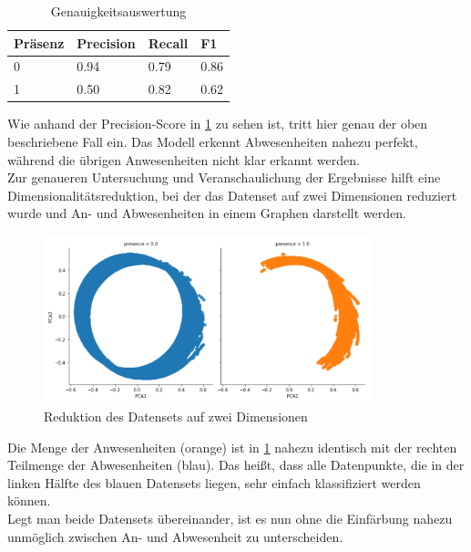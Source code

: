 \begin{center}
    \begin{table}[h]
        \centering
        \caption{Genauigkeitsauswertung}
        \begin{tabular}{|p{1.5cm}||p{1.8cm}|p{1.5cm}|p{1.5cm}|}
            \hline
            \hfill Präsenz&\hfill Precision &\hfill Recall &\hfill F1\\
            \hline
            \hline
            \hfill 0&\hfill 0.94&\hfill 0.79&\hfill 0.86\\
            \hfill 1&\hfill 0.50&\hfill 0.82&\hfill 0.62\\
            \hline
        \end{tabular}          
        \label{tab:clus}
    \end{table}
\end{center}

Wie anhand der Precision-Score in \ref{tab:clus} zu sehen ist, tritt hier genau der oben beschriebene Fall ein.
Das Modell erkennt Abwesenheiten nahezu perfekt, während die übrigen Anwesenheiten nicht klar erkannt werden.\\
\newpage
Zur genaueren Untersuchung und Veranschaulichung der Ergebnisse hilft eine Dimensionalitätsreduktion, 
bei der das Datenset auf zwei Dimensionen reduziert wurde und An- und Abwesenheiten in einem Graphen darstellt werden.

\begin{figure}[h]
    \centering
    \includegraphics[width=0.85\textwidth]{pic/pca.png}
    \caption{Reduktion des Datensets auf zwei Dimensionen}
    \label{fig:pca}
\end{figure}

Die Menge der Anwesenheiten (orange) ist in \ref{fig:pca} nahezu identisch mit der rechten Teilmenge der 
Abwesenheiten (blau). 
Das heißt, dass alle Datenpunkte, die in der linken Hälfte des blauen Datensets liegen, sehr einfach klassifiziert 
werden können.\\
Legt man beide Datensets übereinander, ist es nun ohne die Einfärbung nahezu unmöglich zwischen An- und 
Abwesenheit zu unterscheiden.\\

